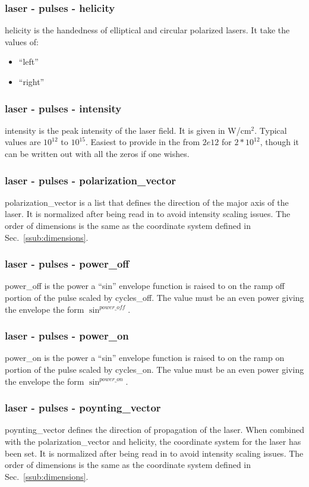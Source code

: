 \documentclass{article}
\begin{document}
\subsubsection{laser - pulses - helicity}
helicity is the handedness of elliptical and circular polarized lasers. It take the values of:
\begin{itemize}
  \item ``left''
  \item ``right''
\end{itemize}

\subsubsection{laser - pulses - intensity}
intensity is the peak intensity of the laser field. It is given in W/cm$^2$. Typical values are $10^{12}$ to $10^{15}$. Easiest to provide in the from $2e12$ for $2*10^{12}$, though it can be written out with all the zeros if one wishes.

\subsubsection{laser - pulses - polarization\_vector}
polarization\_vector is a list that defines the direction of the major axis of the laser. It is normalized after being read in to avoid intensity scaling issues. The order of dimensions is the same as the coordinate system defined in Sec.~\ref{ssub:dimensions}.

\subsubsection{laser - pulses - power\_off}
power\_off is the power a ``sin'' envelope function is raised to on the ramp off portion of the pulse scaled by cycles\_off. The value must be an even power giving the envelope the form $\sin^{power\_off}$.

\subsubsection{laser - pulses - power\_on}
power\_on is the power a ``sin'' envelope function is raised to on the ramp on portion of the pulse scaled by cycles\_on. The value must be an even power giving the envelope the form $\sin^{power\_on}$.

\subsubsection{laser - pulses - poynting\_vector}
poynting\_vector defines the direction of propagation of the laser. When combined with the polarization\_vector and helicity, the coordinate system for the laser has been set. It is normalized after being read in to avoid intensity scaling issues. The order of dimensions is the same as the coordinate system defined in Sec.~\ref{ssub:dimensions}.
\end{document}

